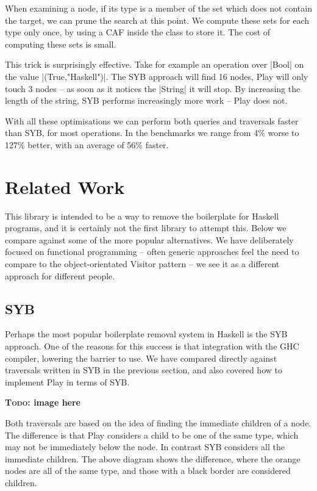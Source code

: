 \documentclass[preprint]{sigplanconf}
\newcommand{\todo}[1]{\textbf{\textsc{Todo:} #1}}
\begin{document}
When examining a node, if its type is a member of the set which does not contain the target, we can prune the search at this point. We compute these sets for each type only once, by using a CAF inside the class to store it. The cost of computing these sets is small.

This trick is surprisingly effective. Take for example an operation over |Bool| on the value |(True,"Haskell")|. The SYB approach will find 16 nodes, Play will only touch 3 nodes -- as soon as it notices the |String| it will stop. By increasing the length of the string, SYB performs increasingly more work -- Play does not.

With all these optimisations we can perform both queries and traversals faster than SYB, for most operations. In the benchmarks we range from 4\% worse to 127\% better, with an average of 56\% faster.


\section{Related Work}
\label{sec:related}

This library is intended to be a way to remove the boilerplate for Haskell programs, and it is certainly not the first library to attempt this. Below we compare against some of the more popular alternatives. We have deliberately focused on functional programming -- often generic approaches feel the need to compare to the object-orientated Visitor pattern -- we see it as a different approach for different people.

\subsection{SYB}

Perhaps the most popular boilerplate removal system in Haskell is the SYB approach. One of the reasons for this success is that integration with the GHC compiler, lowering the barrier to use. We have compared directly against traversals written in SYB in the previous section, and also covered how to implement Play in terms of SYB.

\todo{image here}

Both traversals are based on the idea of finding the immediate children of a node. The difference is that Play considers a child to be one of the same type, which may not be immediately below the node. In contrast SYB considers all the immediate children. The above diagram shows the difference, where the orange nodes are all of the same type, and those with a black border are considered children.
\end{document}
